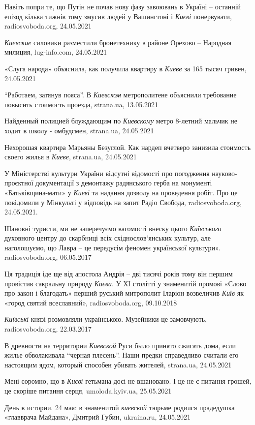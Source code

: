 Навіть попри те, що Путін не почав нову фазу завоювань в Україні – останній
епізод кілька тижнів тому змусив людей у Вашингтоні і \emph{Києві} понервувати,
radiosvoboda.org, 24.05.2021

\emph{Киевские} силовики разместили бронетехнику в районе Орехово – Народная
милиция, lug-info.com, 24.05.2021

«Слуга народа» объяснила, как получила квартиру в \emph{Киеве} за 165 тысяч
гривен, 24.05.2021 

\enquote{Работаем, затянув пояса}. В \emph{Киевском} метрополитене объяснили
требование повысить стоимость проезда, strana.ua, 13.05.2021

Найденный полицией блуждающим по \emph{Киевскому} метро 8-летний мальчик не
ходит в школу - омбудсмен, strana.ua, 24.05.2021

Нехорошая квартира Марьяны Безуглой. Как нардеп вчетверо занизила стоимость
своего жилья в \emph{Киеве}, strana.ua, 24.05.2021

У Міністерстві культури України відсутні відомості про погодження
науково-проєктної документації з демонтажу радянського герба на монументі
«Батьківщина-мати» у \emph{Києві} та надання дозволу на проведення робіт. Про це
повідомили у Мінкульті у відповідь на запит Радіо Свобода, radiosvoboda.org, 24.05.2021.


Шановні туристи, ми не заперечуємо вагомості внеску цього \emph{Київського}
духовного центру до скарбниці всіх східнослов'янських культур, але наголошуємо,
що Лавра – це передусім феномен української культури».
radiosvoboda.org, 06.05.2017

Ця традиція іде ще від апостола Андрія – дві тисячі років тому він першим
провістив сакральну природу \emph{Києва}. У ХІ столітті у знаменитій промові
«Слово про закон і благодать» перший руський митрополит Іларіон возвеличив
\emph{Київ} як «город святий всеславний», radiosvoboda.org, 09.10.2018

\emph{Київські} князі розмовляли українською. Музейники це замовчують,
radiosvoboda.org, 22.03.2017

В древности на территории \emph{Киевской} Руси было принято сжигать дома, если жилье
обволакивала \enquote{черная плесень}. Наши предки справедливо считали его настоящим
ядом, который способен убивать жителей, strana.ua, 24.05.2021

Мені соромно, що в \emph{Києві} гетьмана досі не вшановано. І це не є питання грошей,
це скоріше питання серця, umoloda.kyiv.ua, 25.05.2021

День в истории. 24 мая: в знаменитой \emph{киевской} тюрьме родился прадедушка
«главврача Майдана», Дмитрий Губин, ukraina.ru, 24.05.2021

